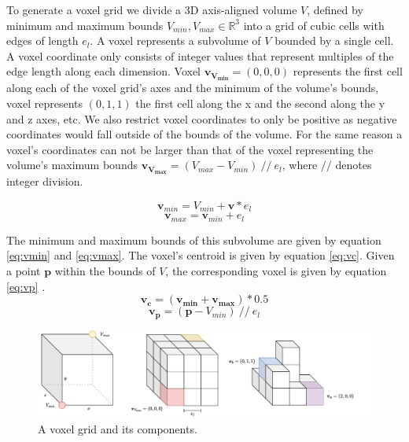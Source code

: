 To generate a voxel grid we divide a 3D axis-aligned volume \(V\), defined by minimum and maximum bounds \(V_{min}, V_{max} \in \mathbb{R}^{3}\) into a grid of cubic cells with edges of length \(e_{l}\). A voxel represents a subvolume of \(V\) bounded by a single cell. A voxel coordinate only consists of integer values that represent multiples of the edge length along each dimension. Voxel \(\boldsymbol{v_{V_{min}}} = (0,0,0)\) represents the first cell along each of the voxel grid's axes and the minimum of the volume's bounds, voxel represents \((0,1,1)\) the first cell along the x and the second along the y and z axes, etc. We also restrict voxel coordinates to only be positive as negative coordinates would fall outside of the bounds of the volume. For the same reason a voxel's coordinates can not be larger than that of the voxel representing the volume's maximum bounds \(\boldsymbol{v_{V_{max}}} = (V_{max} - V_{min})\ //\ e_l\), where \(//\) denotes integer division. 


\begin{equation}
    \label{eq:vmin}
\boldsymbol{v}_{min} = V_{min} + \boldsymbol{v}*e_{l}
\end{equation}
\begin{equation}
    \label{eq:vmax}
\boldsymbol{v}_{max} = \boldsymbol{v}_{min} + e_{l}
\end{equation}

The minimum and maximum bounds of this subvolume are given by equation \ref{eq:vmin} and \ref{eq:vmax}. The voxel's centroid is given by equation \ref{eq:vc}. Given a point \(\boldsymbol{p}\) within the bounds of \(V\), the corresponding voxel is given by equation \ref{eq:vp} . 
\begin{equation}
    \label{eq:vc}
    \boldsymbol{v_c} = (\boldsymbol{v_{min}} + \boldsymbol{v_{max}})*0.5
\end{equation}
\begin{equation}
    \label{eq:vp}
    \boldsymbol{v_p} = (\boldsymbol{p} - V_{min})\ //\ e_l
\end{equation}


\begin{figure}[h]
    \centering
    \includegraphics*[width=\textwidth]{./fig/voxel_basics.pdf}
    \caption{A voxel grid and its components.}
    \label{fig:vg_basic}
\end{figure}


